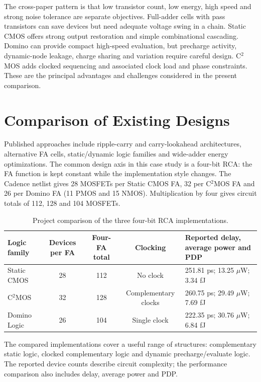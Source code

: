 \documentclass[11pt,a4paper]{article}
\begin{document}
The cross-paper pattern is that low transistor count, low energy, high speed and strong noise tolerance are separate objectives. Full-adder cells with pass transistors can save devices but need adequate voltage swing in a chain. Static CMOS offers strong output restoration and simple combinational cascading. Domino can provide compact high-speed evaluation, but precharge activity, dynamic-node leakage, charge sharing and variation require careful design. C$^{2}$MOS adds clocked sequencing and associated clock load and phase constraints. These are the principal advantages and challenges considered in the present comparison.

\section{Comparison of Existing Designs}
Published approaches include ripple-carry and carry-lookahead architectures, alternative FA cells, static/dynamic logic families and wide-adder energy optimizations. The common design axis in this case study is a four-bit RCA: the FA function is kept constant while the implementation style changes. The Cadence netlist gives 28 MOSFETs per Static CMOS FA, 32 per C$^{2}$MOS FA and 26 per Domino FA (11 PMOS and 15 NMOS). Multiplication by four gives circuit totals of 112, 128 and 104 MOSFETs.

\begin{table}[htbp]
\centering
\caption{Project comparison of the three four-bit RCA implementations.}
\label{tab:comparison}\small
\begin{tabularx}{\textwidth}{l c c c X}
\toprule Logic family & Devices per FA & Four-FA total & Clocking & Reported delay, average power and PDP\\
\midrule
Static CMOS & 28 & 112 & No clock & 251.81 ps; 13.25 $\mu$W; 3.34 fJ\\
C$^{2}$MOS & 32 & 128 & Complementary clocks & 260.75 ps; 29.49 $\mu$W; 7.69 fJ\\
Domino Logic & 26 & 104 & Single clock & 222.35 ps; 30.76 $\mu$W; 6.84 fJ\\
\bottomrule
\end{tabularx}\end{table}
The compared implementations cover a useful range of structures: complementary static logic, clocked complementary logic and dynamic precharge/evaluate logic. The reported device counts describe circuit complexity; the performance comparison also includes delay, average power and PDP.
\end{document}
